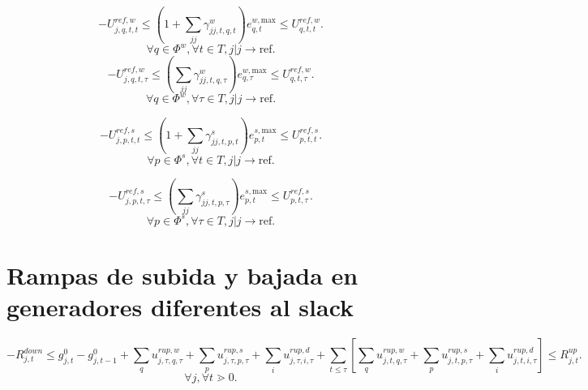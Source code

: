 \begin{equation}
-U_{j,q,t,t}^{ref,w} \le \left (1 + \sum_{jj} \gamma_{jj,t,q,t}^{w} \right )e_{q,t}^{w, \text{max}} \le U_{q,t,t}^{ref,w}.
\end{equation}
\begin{equation*}
    \forall q \in \Phi^{w}, \forall t \in T, j|j \rightarrow \text{ref}.
\end{equation*}
\begin{equation}
-U_{j,q,t,\tau}^{ref,w} \le \left (\sum_{jj} \gamma_{jj,t,q,\tau}^{w} \right )e_{q,\tau}^{w, \text{max}} \le U_{q,t,\tau}^{ref,w}.
\end{equation}
\begin{equation*}
    \forall q \in \Phi^{w}, \forall \tau \in T, j|j \rightarrow \text{ref}.
\end{equation*}

\begin{equation}
-U_{j,p,t,t}^{ref,s} \le \left (1 + \sum_{jj} \gamma_{jj,t,p,t}^{s} \right )e_{p,t}^{s, \text{max}} \le U_{p,t,t}^{ref,s}.
\end{equation}
\begin{equation*}
    \forall p \in \Phi^{s}, \forall t \in T, j|j \rightarrow \text{ref}.
\end{equation*}

\begin{equation}
-U_{j,p,t,\tau}^{ref,s} \le \left (\sum_{jj} \gamma_{jj,t,p,\tau}^{s} \right )e_{p,t}^{s, \text{max}} \le U_{p,t,\tau}^{ref,s}.
\end{equation}
\begin{equation*}
    \forall p \in \Phi^{s}, \forall \tau \in T, j|j \rightarrow \text{ref}.
\end{equation*}

\section{Rampas de subida y bajada en generadores diferentes al slack}

\begin{dmath}
-R^{down}_{j,t} \le g^{0}_{j,t} - g^{0}_{j,t-1} + \sum_{q}u^{rup,w}_{j,\tau,q,\tau} + \sum_{p}u^{rup,s}_{j,\tau,p,\tau} + \sum_iu^{rup,d}_{j,\tau,i,\tau} + \sum_{t\le \tau} \left[ \sum_{q}u^{rup,w}_{j,t,q,\tau} + \sum_{p}u^{rup,s}_{j,t,p,\tau} + \sum_iu^{rup,d}_{j,t,i,\tau} \right ] \le R^{up}_{j,t}.
\end{dmath}
\begin{equation*}
    \forall j, \forall t \gtrdot 0.
\end{equation*}

